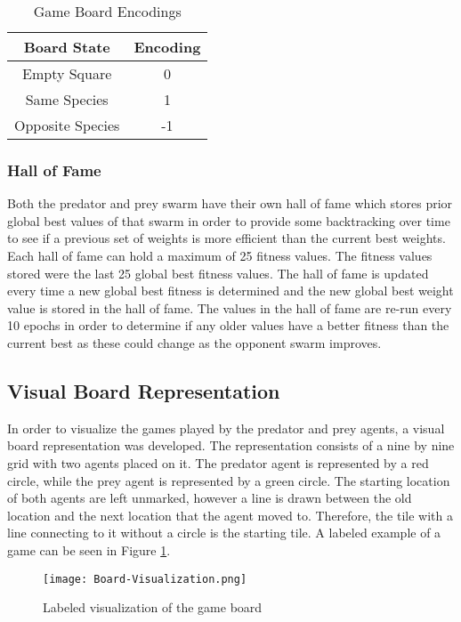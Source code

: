 \begin{table}
  \centering
  \begin{tabular}{|c|c|}
    \hline
    Board State & Encoding \\
    \hline
    Empty Square & 0 \\
    Same Species & 1 \\
    Opposite Species & -1\\
   \hline
  \end{tabular}
  \caption{Game Board Encodings}
  \label{tab:board-encoding-table}
\end{table}

\subsubsection{Hall of Fame}
Both the predator and prey swarm have their own hall of fame which stores prior global best values of that swarm in order to provide some backtracking over time to see if a previous set of weights is more efficient than the current best weights. Each hall of fame can hold a maximum of 25 fitness values. The fitness values stored were the last 25 global best fitness values. The hall of fame is updated every time a new global best fitness is determined and the new global best weight value is stored in the hall of fame. The values in the hall of fame are re-run every 10 epochs in order to determine if any older values have a better fitness than the current best as these could change as the opponent swarm improves.

\subsection{Visual Board Representation}
In order to visualize the games played by the predator and prey agents, a visual board representation was developed. The representation consists of a nine by nine grid with two agents placed on it. The predator agent is represented by a red circle, while the prey agent is represented by a green circle. The starting location of both agents are left unmarked, however a line is drawn between the old location and the next location that the agent moved to. Therefore, the tile with a line connecting to it without a circle is the starting tile. A labeled example of a game can be seen in Figure \ref{fig:label-game-example}.


\begin{figure}
  \centering
  \texttt{[image: Board-Visualization.png]}
  \caption{Labeled visualization of the game board}
  \label{fig:label-game-example}
\end{figure}


